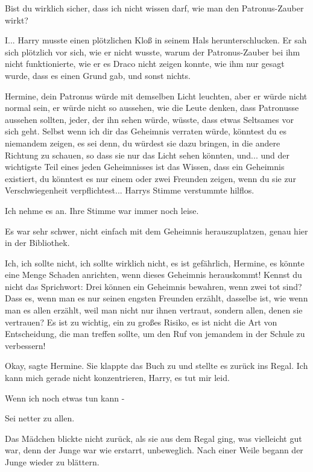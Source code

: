 \glqq Bist du wirklich sicher, dass ich nicht wissen darf, wie man den
Patronus-Zauber wirkt?\grqq{}

\glqq I...\grqq{} Harry musste einen plötzlichen Kloß in seinem Hals
herunterschlucken. Er sah sich plötzlich vor sich, wie er nicht wusste, warum
der Patronus-Zauber bei ihm nicht funktionierte, wie er es Draco nicht zeigen
konnte, wie ihm nur gesagt wurde, dass es einen Grund gab, und sonst nichts.

\glqq Hermine, dein Patronus würde mit demselben Licht leuchten, aber er würde
nicht normal sein, er würde nicht so aussehen, wie die Leute denken, dass
Patronusse aussehen sollten, jeder, der ihn sehen würde, wüsste, dass etwas
Seltsames vor sich geht. Selbst wenn ich dir das Geheimnis verraten würde,
könntest du es niemandem zeigen, es sei denn, du würdest sie dazu bringen, in
die andere Richtung zu schauen, so dass sie nur das Licht sehen könnten, und...
und der wichtigste Teil eines jeden Geheimnisses ist das Wissen, dass ein
Geheimnis existiert, du könntest es nur einem oder zwei Freunden zeigen, wenn du
sie zur Verschwiegenheit verpflichtest...\grqq{} Harrys Stimme verstummte
hilflos.

\glqq Ich nehme es an.\grqq{} Ihre Stimme war immer noch leise.

Es war sehr schwer, nicht einfach mit dem Geheimnis herauszuplatzen, genau hier
in der Bibliothek.

\glqq Ich, ich sollte nicht, ich sollte wirklich nicht, es ist gefährlich,
Hermine, es könnte eine Menge Schaden anrichten, wenn dieses Geheimnis
herauskommt! Kennst du nicht das Sprichwort: Drei können ein Geheimnis bewahren,
wenn zwei tot sind? Dass es, wenn man es nur seinen engsten Freunden erzählt,
dasselbe ist, wie wenn man es allen erzählt, weil man nicht nur ihnen vertraut,
sondern allen, denen sie vertrauen? Es ist zu wichtig, ein zu großes Risiko, es
ist nicht die Art von Entscheidung, die man treffen sollte, um den Ruf von
jemandem in der Schule zu verbessern!\grqq{}

\glqq Okay\grqq{}, sagte Hermine. Sie klappte das Buch zu und stellte es zurück
ins Regal. \glqq Ich kann mich gerade nicht konzentrieren, Harry, es tut mir
leid.\grqq{}

\glqq Wenn ich noch etwas tun kann -\grqq{}

\glqq Sei netter zu allen.\grqq{}

Das Mädchen blickte nicht zurück, als sie aus dem Regal ging, was vielleicht gut
war, denn der Junge war wie erstarrt, unbeweglich. Nach einer Weile begann der
Junge wieder zu blättern.

